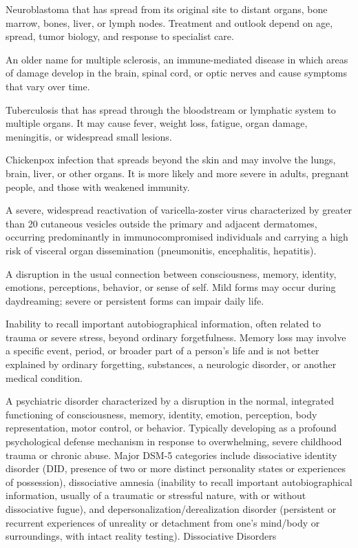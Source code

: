  Neuroblastoma that has spread from its original site to distant organs, bone marrow, bones, liver, or lymph nodes. Treatment and outlook depend on age, spread, tumor biology, and response to specialist care.

 An older name for multiple sclerosis, an immune-mediated disease in which areas of damage develop in the brain, spinal cord, or optic nerves and cause symptoms that vary over time.

 Tuberculosis that has spread through the bloodstream or lymphatic system to multiple organs. It may cause fever, weight loss, fatigue, organ damage, meningitis, or widespread small lesions.

 Chickenpox infection that spreads beyond the skin and may involve the lungs, brain, liver, or other organs. It is more likely and more severe in adults, pregnant people, and those with weakened immunity.

 A severe, widespread reactivation of varicella-zoster virus characterized by greater than 20 cutaneous vesicles outside the primary and adjacent dermatomes, occurring predominantly in immunocompromised individuals and carrying a high risk of visceral organ dissemination (pneumonitis, encephalitis, hepatitis).

 A disruption in the usual connection between consciousness, memory, identity, emotions, perceptions, behavior, or sense of self. Mild forms may occur during daydreaming; severe or persistent forms can impair daily life.

 Inability to recall important autobiographical information, often related to trauma or severe stress, beyond ordinary forgetfulness. Memory loss may involve a specific event, period, or broader part of a person’s life and is not better explained by ordinary forgetting, substances, a neurologic disorder, or another medical condition.

 A psychiatric disorder characterized by a disruption in the normal, integrated functioning of consciousness, memory, identity, emotion, perception, body representation, motor control, or behavior. Typically developing as a profound psychological defense mechanism in response to overwhelming, severe childhood trauma or chronic abuse. Major DSM-5 categories include dissociative identity disorder (DID, presence of two or more distinct personality states or experiences of possession), dissociative amnesia (inability to recall important autobiographical information, usually of a traumatic or stressful nature, with or without dissociative fugue), and depersonalization/derealization disorder (persistent or recurrent experiences of unreality or detachment from one's mind/body or surroundings, with intact reality testing).
\synonyms
Dissociative Disorders

